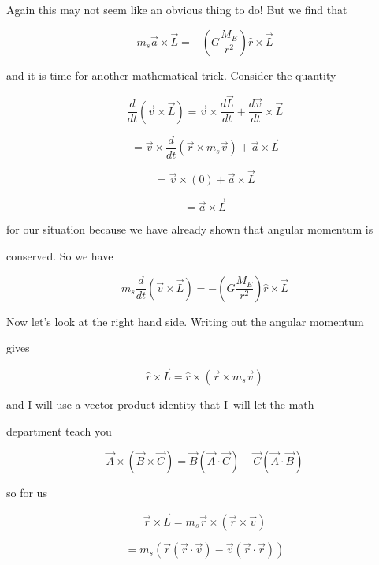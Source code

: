 Again this may not seem like an obvious thing to do! But we find that 

$$m_{s}\overrightarrow{a}\times \overrightarrow{L}=-\left( G\frac{M_{E}}{r^{2}}\right) \hat{r}\times \overrightarrow{L}$$

and it is time for another mathematical trick. Consider the quantity%

$$\frac{d}{dt}\left( \overrightarrow{v}\times \overrightarrow{L}\right) =\overrightarrow{v}\times \frac{d\overrightarrow{L}}{dt}+\frac{d\overrightarrow{v}}{dt}\times \overrightarrow{L}$$

$$=\overrightarrow{v}\times \frac{d}{dt}\left( \overrightarrow{r}\times m_{s}\overrightarrow{v}\right) +\overrightarrow{a}\times \overrightarrow{L}$$

$$=\overrightarrow{v}\times \left( 0\right) +\overrightarrow{a}\times \overrightarrow{L}$$

$$=\overrightarrow{a}\times \overrightarrow{L}$$

for our situation because we have already shown that angular momentum is

conserved. So we have 

$$m_{s}\frac{d}{dt}\left( \overrightarrow{v}\times \overrightarrow{L}\right)=-\left( G\frac{M_{E}}{r^{2}}\right) \hat{r}\times \overrightarrow{L}$$


Now let's look at the right hand side. Writing out the angular momentum

gives 

$$\hat{r}\times \overrightarrow{L}=\hat{r}\times \left( \overrightarrow{r}\times m_{s}\overrightarrow{v}\right) $$

and I will use a vector product identity that I\ will let the math

department teach you

$$\overrightarrow{A}\times \left( \overrightarrow{B}\times \overrightarrow{C}\right) =\overrightarrow{B}\left( \overrightarrow{A}\cdot \overrightarrow{C}\right) -\overrightarrow{C}\left( \overrightarrow{A}\cdot \overrightarrow{B}\right) $$

so for us 

$$\overrightarrow{r}\times \overrightarrow{L}=m_{s}\overrightarrow{r}\times\left( \overrightarrow{r}\times \overrightarrow{v}\right) $$

$$=m_{s}\left( \overrightarrow{r}\left( \overrightarrow{r}\cdot \overrightarrow{v}\right) -\overrightarrow{v}\left( \overrightarrow{r}\cdot \overrightarrow{r}\right) \right) $$

